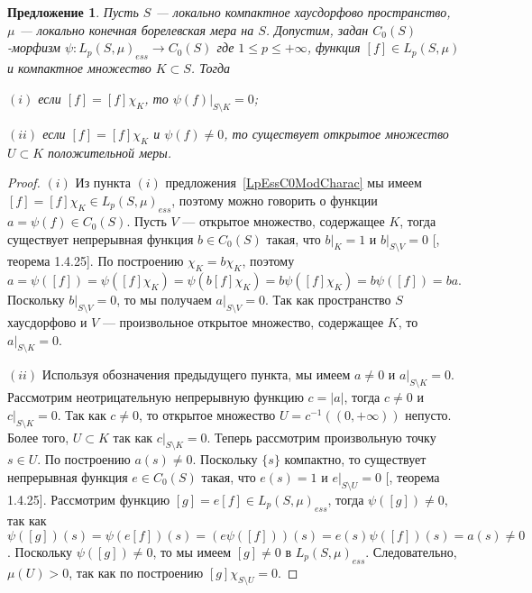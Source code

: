 \documentclass[12pt]{article}
\newtheorem{proposition}[theorem]{Предложение}
\begin{document}
\begin{proposition}\label{MorphLpEssC0Prop} Пусть $S$ --- локально компактное
    хаусдорфово пространство, $\mu$ --- локально конечная борелевская мера на
    $S$. Допустим, задан $C_0(S)$-морфизм $\psi:{L_p(S,\mu)}_{ess}\to C_0(S)$
    где $1\leq p\leq+\infty$, функция $[f]\in L_p(S,\mu)$ и компактное множество
    $K\subset S$. Тогда

    $(i)$ если $[f]=[f]\chi_K$, то $\psi(f)|_{S\setminus K}=0$;

    $(ii)$ если $[f]=[f]\chi_K$ и $\psi(f)\neq 0$, то существует открытое
    множество $U\subset K$ положительной меры.
\end{proposition}
\begin{proof} $(i)$ Из пункта $(i)$ предложения~\ref{LpEssC0ModCharac} мы имеем
    $[f]=[f]\chi_K\in {L_p(S,\mu)}_{ess}$, поэтому можно говорить о функции
    $a=\psi(f)\in C_0(S)$. Пусть $V$ --- открытое множество, содержащее $K$,
    тогда существует непрерывная функция $b\in C_0(S)$ такая, что $b|_K=1$ и
    $b|_{S\setminus V}=0$ [\cite{DalesBanSpContFunDualSp}, теорема 1.4.25]. По
    построению $\chi_K=b\chi_K$, поэтому
    $a=\psi([f])=\psi([f]\chi_K)=\psi(b[f]\chi_K)=b\psi([f]\chi_K)=b\psi([f])=ba$.
    Поскольку $b|_{S\setminus V}=0$, то мы получаем $a|_{S\setminus V}=0$. Так
    как пространство $S$ хаусдорфово и $V$ --- произвольное открытое множество,
    содержащее $K$, то $a|_{S\setminus K}=0$.

    $(ii)$ Используя обозначения предыдущего пункта, мы имеем $a\neq 0$ и
    $a|_{S\setminus K}=0$. Рассмотрим неотрицательную непрерывную функцию
    $c=|a|$, тогда $c\neq 0$ и $c|_{S\setminus K}=0$. Так как $c\neq 0$, то
    открытое множество $U=c^{-1}((0, +\infty))$ непусто. Более того, $U\subset
        K$ так как $c|_{S\setminus K}=0$. Теперь рассмотрим произвольную точку $s\in
        U$. По построению $a(s)\neq 0$. Поскольку $\{s\}$ компактно, то существует
    непрерывная функция $e\in C_0(S)$ такая, что $e(s)=1$ и $e|_{S\setminus
        U}=0$ [\cite{DalesBanSpContFunDualSp}, теорема 1.4.25]. Рассмотрим функцию
    $[g]=e[f]\in {L_p(S,\mu)}_{ess}$, тогда $\psi([g])\neq 0$, так как
    $\psi([g])(s)=\psi(e[f])(s)=(e\psi([f]))(s)=e(s)\psi([f])(s)=a(s)\neq 0$.
    Поскольку $\psi([g])\neq 0$, то мы имеем $[g]\neq 0$ в ${L_p(S,\mu)}_{ess}$.
    Следовательно, $\mu(U)>0$, так как по построению $[g]\chi_{S\setminus U}=0$.
\end{proof}
\end{document}
